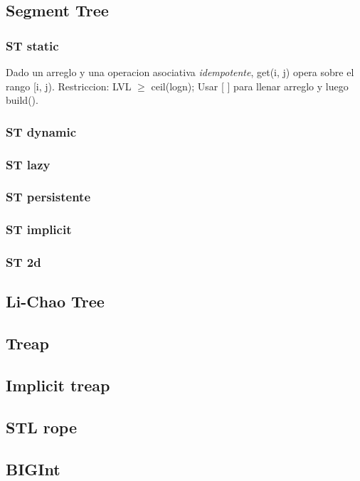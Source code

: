 \subsection{Segment Tree}
\subsubsection{ST static}
Dado un arreglo y una operacion asociativa \emph{idempotente}, get(i, j) opera sobre el rango [i, j). Restriccion: LVL $\ge$ ceil(logn); Usar [ ] para llenar arreglo y luego build().

\subsubsection{ST dynamic}

\subsubsection{ST lazy}

\subsubsection{ST persistente}

\subsubsection{ST implicit}

\subsubsection{ST 2d}


\subsection{Li-Chao Tree}


\subsection{Treap}

\subsection{Implicit treap}

\subsection{STL rope}



\subsection{BIGInt}

